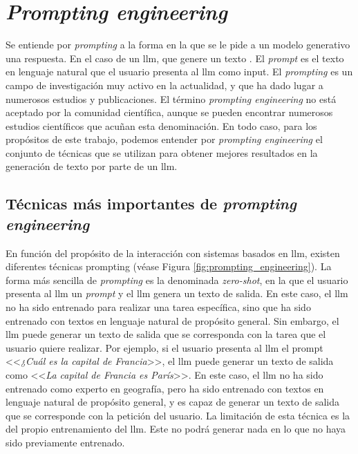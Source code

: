 \section{\emph{Prompting engineering}}
\label{sec:llm_tecnicas_prompting}

Se entiende por \emph{prompting} a la forma en la que se le pide a un modelo generativo una respuesta. En el caso de un \gls{llm}, que genere un texto \citep{LLMPromptingGuide}. El \emph{prompt} es el texto en lenguaje natural que el usuario presenta al \gls{llm} como input. El \emph{prompting} es un campo de investigación muy activo en la actualidad, y que ha dado lugar a numerosos estudios y publicaciones. El término \emph{prompting engineering} no está aceptado por la comunidad científica, aunque se pueden encontrar numerosos estudios científicos que acuñan esta denominación. En todo caso, para los propósitos de este trabajo, podemos entender por \emph{prompting engineering} el conjunto de técnicas que se utilizan para obtener mejores resultados en la generación de texto por parte de un \gls{llm}. 

\subsection{Técnicas más importantes de \emph{prompting engineering}}

En función del propósito de la interacción con sistemas basados en \gls{llm}, existen diferentes técnicas {prompting} (véase Figura \ref{fig:prompting_engineering}). La forma más sencilla de \emph{prompting} es la denominada \emph{zero-shot}, en la que el usuario presenta al \gls{llm} un \emph{prompt} y el \gls{llm} genera un texto de salida. En este caso, el \gls{llm} no ha sido entrenado para realizar una tarea específica, sino que ha sido entrenado con textos en lenguaje natural de propósito general. Sin embargo, el \gls{llm} puede generar un texto de salida que se corresponda con la tarea que el usuario quiere realizar. Por ejemplo, si el usuario presenta al \gls{llm} el {prompt} <<\emph{¿Cuál es la capital de Francia}>>, el \gls{llm} puede generar un texto de salida como <<\emph{La capital de Francia es París}>>. En este caso, el \gls{llm} no ha sido entrenado como experto en geografía, pero ha sido entrenado con textos en lenguaje natural de propósito general, y es capaz de generar un texto de salida que se corresponde con la petición del usuario. La limitación de esta técnica es la del propio entrenamiento del \gls{llm}. Este no podrá generar nada en lo que no haya sido previamente entrenado.


